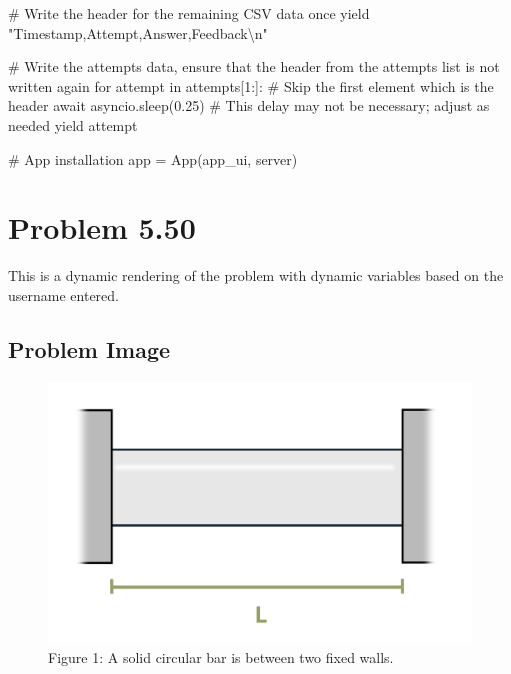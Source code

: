 \documentclass[
  letterpaper,
  DIV=11,
  numbers=noendperiod]{scrreprt}
\newenvironment{Shaded}{\begin{snugshade}}{\end{snugshade}}
\newcommand{\NormalTok}[1]{\textcolor[rgb]{0.00,0.23,0.31}{#1}}
\begin{document}
\begin{Shaded}
\begin{Highlighting}[]
\NormalTok{        \# Write the header for the remaining CSV data once}
\NormalTok{        yield "Timestamp,Attempt,Answer,Feedback\textbackslash{}n"}
        
\NormalTok{        \# Write the attempts data, ensure that the header from the attempts list is not written again}
\NormalTok{        for attempt in attempts[1:]:  \# Skip the first element which is the header}
\NormalTok{            await asyncio.sleep(0.25)  \# This delay may not be necessary; adjust as needed}
\NormalTok{            yield attempt}


\NormalTok{\# App installation}
\NormalTok{app = App(app\_ui, server)}
\end{Highlighting}
\end{Shaded}

\chapter*{Problem 5.50}\label{problem-5.50}


This is a dynamic rendering of the problem with dynamic variables based
on the username entered.

\section*{Problem Image}\label{problem-image-29}


\begin{figure}[H]

{\centering \includegraphics{images/222.png}

}

\caption{Figure 1: A solid circular bar is between two fixed walls.}

\end{figure}%
\end{document}
